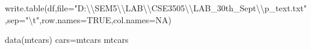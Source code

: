 \documentclass[
]{article}
\newenvironment{Shaded}{\begin{snugshade}}{\end{snugshade}}
\newcommand{\AttributeTok}[1]{\textcolor[rgb]{0.77,0.63,0.00}{#1}}
\newcommand{\ConstantTok}[1]{\textcolor[rgb]{0.00,0.00,0.00}{#1}}
\newcommand{\FunctionTok}[1]{\textcolor[rgb]{0.00,0.00,0.00}{#1}}
\newcommand{\NormalTok}[1]{#1}
\newcommand{\OtherTok}[1]{\textcolor[rgb]{0.56,0.35,0.01}{#1}}
\newcommand{\SpecialCharTok}[1]{\textcolor[rgb]{0.00,0.00,0.00}{#1}}
\newcommand{\StringTok}[1]{\textcolor[rgb]{0.31,0.60,0.02}{#1}}
\begin{document}
\begin{Shaded}
\begin{Highlighting}[]
\FunctionTok{write.table}\NormalTok{(df,}\AttributeTok{file=}\StringTok{"D:}\SpecialCharTok{\textbackslash{}\textbackslash{}}\StringTok{SEM5}\SpecialCharTok{\textbackslash{}\textbackslash{}}\StringTok{LAB}\SpecialCharTok{\textbackslash{}\textbackslash{}}\StringTok{CSE3505}\SpecialCharTok{\textbackslash{}\textbackslash{}}\StringTok{LAB\_30th\_Sept}\SpecialCharTok{\textbackslash{}\textbackslash{}}\StringTok{p\_text.txt"}\NormalTok{,}\AttributeTok{sep=}\StringTok{"}\SpecialCharTok{\textbackslash{}t}\StringTok{"}\NormalTok{,}\AttributeTok{row.names=}\ConstantTok{TRUE}\NormalTok{,}\AttributeTok{col.names=}\ConstantTok{NA}\NormalTok{)}
\end{Highlighting}
\end{Shaded}

\begin{Shaded}
\begin{Highlighting}[]
\FunctionTok{data}\NormalTok{(mtcars)}
\NormalTok{cars}\OtherTok{=}\NormalTok{mtcars}
\NormalTok{mtcars}
\end{Highlighting}
\end{Shaded}
\end{document}
